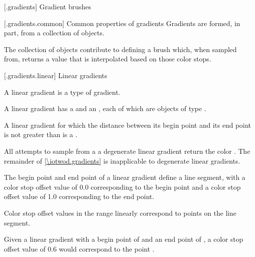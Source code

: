  [\iotwod.gradients] {Gradient brushes}

 [\iotwod.gradients.common] {Common properties of gradients}
\pnum
Gradients are formed, in part, from a collection of  objects.

\pnum
The collection of  objects contribute to defining a brush which, when sampled from, returns a value that is interpolated based on those color stops.

 [\iotwod.gradients.linear] {Linear gradients}

\pnum
A linear gradient is a type of gradient.

\pnum
A linear gradient has a  and an , each of which are objects of type .

\pnum
A linear gradient for which the distance between its begin point and its end point is not greater than  is a .

\pnum
All attempts to sample from a a degenerate linear gradient return the color . The remainder of \ref{\iotwod.gradients} is inapplicable to degenerate linear gradients.

\pnum
The begin point and end point of a linear gradient define a line segment, with a color stop offset value of 0.0 corresponding to the begin point and a color stop offset value of 1.0 corresponding to the end point.

\pnum
Color stop offset values in the range  linearly correspond to points on the line segment.

\pnum
\begin{example}
Given a linear gradient with a begin point of  and an end point of , a color stop offset value of 0.6 would correspond to the point .
\end{example}

